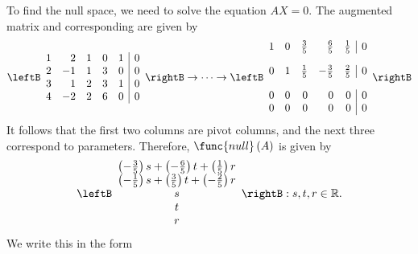 \begin{solution}
To find the null space, we need to solve the equation $AX=0$. The augmented matrix and corresponding \rref \;are given by 
\begin{equation*}
\leftB 
\begin{array}{rrrrr|r}
1 & 2 & 1 & 0 & 1 & 0 \\ 
2 & -1 & 1 & 3 & 0 & 0 \\ 
3 & 1 & 2 & 3 & 1 & 0 \\ 
4 & -2 & 2 & 6 & 0 & 0
\end{array}
\rightB
\rightarrow \cdots \rightarrow
\leftB 
\begin{array}{rrrrr|r}
1 & 0 & \vspace{0.05in}\frac{3}{5} & \vspace{0.05in}\frac{6}{5} & \vspace{0.05in}\frac{1}{5} & 0 \\ 
0 & 1 & \vspace{0.05in}\frac{1}{5} & -\vspace{0.05in}\frac{3}{5} & \vspace{0.05in}\frac{2}{5} & 0 \\ 
0 & 0 & 0 & 0 & 0 & 0 \\ 
0 & 0 & 0 & 0 & 0 & 0
\end{array}
\rightB
\end{equation*}
It follows that the first two columns are pivot columns, and the next three correspond to parameters. Therefore, $\func{null} \left( A\right) $ is given by 
\begin{equation*}
\leftB 
\begin{array}{c}
\left( -\vspace{0.05in}\frac{3}{5}\right) s +\left( -\vspace{0.05in}\frac{6}{5}\right) t+\left( 
\vspace{0.05in}\frac{1}{5}\right) r \\ 
\left( -\vspace{0.05in}\frac{1}{5}\right) s +\left( \vspace{0.05in}\frac{3}{5}\right) t +\left( -
\vspace{0.05in}\frac{2}{5}\right) r \\ 
s \\ 
t \\ 
r
\end{array}
\rightB :s ,t ,r\in \mathbb{R}\text{.}
\end{equation*}
We write this in the form 
\begin{equation*}

\end{equation*}
\end{solution}
